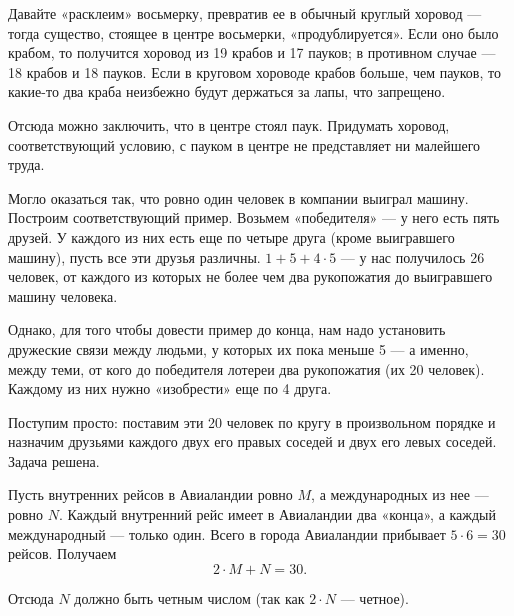 ﻿
\begin{itemize}
\itA Давайте «расклеим» восьмерку, превратив ее в обычный круглый хоровод — тогда существо, стоящее в центре восьмерки, «продублируется». Если оно было крабом, то получится хоровод из 19 крабов и 17 пауков; в противном случае — 18 крабов и 18 пауков. Если в круговом хороводе крабов больше, чем пауков, то какие-то два краба неизбежно будут держаться за лапы, что запрещено.

\ms Отсюда можно заключить, что в центре стоял паук. Придумать хоровод, соответствующий условию, с пауком в центре не представляет ни малейшего труда.

\itB Могло оказаться так, что ровно один человек в компании выиграл машину. Построим соответствующий пример. Возьмем «победителя» — у него есть пять друзей. У каждого из них есть еще по четыре друга (кроме выигравшего машину), пусть все эти друзья различны. $1+5+4 \cdot 5$ — у нас получилось 26 человек, от каждого из которых не более чем два рукопожатия до выигравшего машину человека.

\ms Однако, для того чтобы довести пример до конца, нам надо установить дружеские связи между людьми, у которых их пока меньше 5 — а именно, между теми, от кого до победителя лотереи два рукопожатия (их 20 человек). Каждому из них нужно «изобрести» еще по 4 друга.

\ms Поступим просто: поставим эти 20 человек по кругу в произвольном порядке и назначим друзьями каждого двух его правых соседей и двух его левых соседей. Задача решена.

\itC Пусть внутренних рейсов в Авиаландии ровно $M$, а международных из нее — ровно $N$. Каждый внутренний рейс имеет в Авиаландии два «конца», а каждый международный — только один. Всего в города Авиаландии прибывает $5 \cdot 6 = 30$ рейсов. Получаем
	$$2 \cdot M + N = 30.$$

Отсюда $N$ должно быть четным числом (так как $2 \cdot N$ — четное).
\end{itemize}